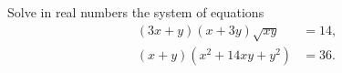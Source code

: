 \documentclass[12pt, a4paper]{article}
\begin{document}
Solve in real numbers the system of equations
\setcounter{equation}{10}
\begin{align}
	\nonumber (3 x + y)(x + 3y)\sqrt{xy} &= 14,\\
	(x+y)(x^2 + 14xy + y^2) &=36.
\end{align}
\end{document}
